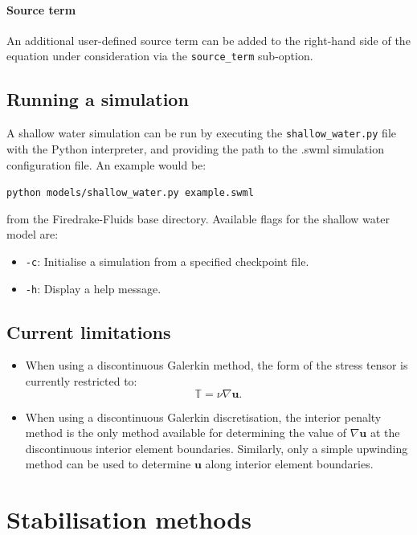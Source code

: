 \documentclass[a4paper,11pt]{report}
\begin{document}
\subsubsection{Source term}
An additional user-defined source term can be added to the right-hand side of the equation under consideration via the \texttt{source\_term} sub-option.

\section{Running a simulation}\label{sect:running_a_simulation}
A shallow water simulation can be run by executing the \texttt{shallow\_water.py} file with the Python interpreter, and providing the path to the .swml simulation configuration file. An example would be:

\texttt{python models/shallow\_water.py example.swml}

from the Firedrake-Fluids base directory. Available flags for the shallow water model are:

\begin{itemize}
   \item \texttt{-c}: Initialise a simulation from a specified checkpoint file.
   \item \texttt{-h}: Display a help message.
\end{itemize}

\section{Current limitations}
\begin{itemize}
   \item When using a discontinuous Galerkin method, the form of the stress tensor is currently restricted to:
   \begin{equation}
      \mathbb{T} = \nu\nabla\mathbf{u}.
   \end{equation}
   \item When using a discontinuous Galerkin discretisation, the interior penalty method \citep{Arnold_1982} is the only method available for determining the value of $\nabla\mathbf{u}$ at the discontinuous interior element boundaries. Similarly, only a simple upwinding method can be used to determine $\mathbf{u}$ along interior element boundaries.
\end{itemize}


\chapter{Stabilisation methods}\label{chap:stabilisation}
\end{document}
